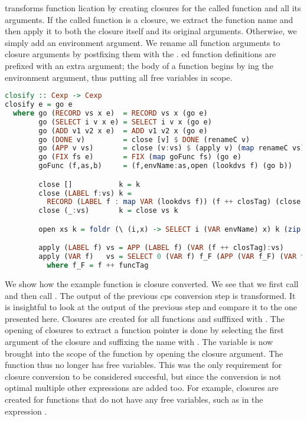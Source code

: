 { transforms function lication by creating closures for the called function and all its arguments. If the called function is a closure, we extract the function name and then apply it to both the closure itself and its original arguments. Otherwise, we simply add an environment argument. We rename all function arguments to closure arguments by postfixing them with the . ed function definitions are prefixed with an extra  argument; the body of a function begins by ing the environment argument, thus putting all free variables in scope.

\begin{lstlisting}[language=Haskell]
closify :: Cexp -> Cexp
closify e = go e
  where go (RECORD vs x e)  = RECORD vs x (go e)
        go (SELECT i v x e) = SELECT i v x (go e)
        go (ADD v1 v2 x e)  = ADD v1 v2 x (go e)
        go (DONE v)         = close [v] $ DONE (renameC v)
        go (APP v vs)       = close (v:vs) $ (apply v) (map renameC vs)
        go (FIX fs e)       = FIX (map goFunc fs) (go e)
        goFunc (f,as,b)     = (f,envName:as,open (lookdvs f) (go b))

        close []           k = k
        close (LABEL f:vs) k =
          RECORD (LABEL f : map VAR (lookdvs f)) (f ++ closTag) (close vs k)
        close (_:vs)       k = close vs k

        open xs k = foldr (\ (i,x) -> SELECT i (VAR envName) x) k (zip [1..] xs)

        apply (LABEL f) vs = APP (LABEL f) (VAR (f ++ closTag):vs)
        apply (VAR f)   vs = SELECT 0 (VAR f) f_F (APP (VAR f_F) (VAR f:vs))
          where f_F = f ++ funcTag
\end{lstlisting}
We show how the example function  is closure converted. We see that we first call  and then call . The output of the previous cps conversion step is transformed. It is insightful to look at the output of the previous step and compare it to the one presented here. Closures are created for all functions and sufffixed with . The opening of closures to extract a function pointer is done by selecting the first argument of the closure and suffixing the name with . The variable  is now brought into the scope of the function  by opening the closure argument. The function  thus no longer has free variables. This was the only requirement for closure conversion to be considered succesful, but since the conversion is not optimal multiple other expressions are added too. For example, closures are created for functions that do not have any free variables, such as in the expression .

}
